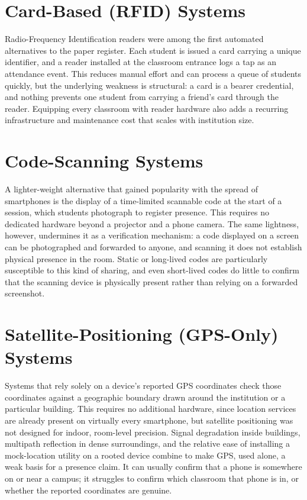\documentclass[12pt, a4paper, oneside]{report}
\begin{document}
\section{Card-Based (RFID) Systems}

Radio-Frequency Identification readers were among the first automated alternatives to the paper register. Each student is issued a card carrying a unique identifier, and a reader installed at the classroom entrance logs a tap as an attendance event. This reduces manual effort and can process a queue of students quickly, but the underlying weakness is structural: a card is a bearer credential, and nothing prevents one student from carrying a friend's card through the reader. Equipping every classroom with reader hardware also adds a recurring infrastructure and maintenance cost that scales with institution size.

\section{Code-Scanning Systems}

A lighter-weight alternative that gained popularity with the spread of smartphones is the display of a time-limited scannable code at the start of a session, which students photograph to register presence. This requires no dedicated hardware beyond a projector and a phone camera. The same lightness, however, undermines it as a verification mechanism: a code displayed on a screen can be photographed and forwarded to anyone, and scanning it does not establish physical presence in the room. Static or long-lived codes are particularly susceptible to this kind of sharing, and even short-lived codes do little to confirm that the scanning device is physically present rather than relying on a forwarded screenshot.

\section{Satellite-Positioning (GPS-Only) Systems}

Systems that rely solely on a device's reported GPS coordinates check those coordinates against a geographic boundary drawn around the institution or a particular building. This requires no additional hardware, since location services are already present on virtually every smartphone, but satellite positioning was not designed for indoor, room-level precision. Signal degradation inside buildings, multipath reflection in dense surroundings, and the relative ease of installing a mock-location utility on a rooted device combine to make GPS, used alone, a weak basis for a presence claim. It can usually confirm that a phone is somewhere on or near a campus; it struggles to confirm which classroom that phone is in, or whether the reported coordinates are genuine.
\end{document}
